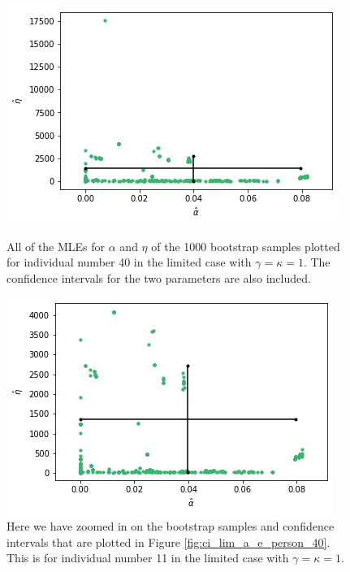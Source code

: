 \begin{figure}
    \centering
    \begin{minipage}{0.48\textwidth}
        \centering
        \includegraphics[scale=0.37]{pictures/ci_lim_a_e_person40.png}
        \caption[MLEs for $\alpha$ and $\eta$ for bootstrap samples individual 40, limited]{All of the MLEs for $\alpha$ and $\eta$ of the 1000 bootstrap samples plotted for individual number 40 in the limited case with $\gamma=\kappa=1$. The confidence intervals for the two parameters are also included.}
        \label{fig:ci_lim_a_e_person_40}
    \end{minipage}\hfill
    \begin{minipage}{0.48\textwidth}
        \centering
        \includegraphics[scale=0.37]{pictures/ci_lim_a_e_person40_zoomed.png}
        \caption[MLEs for $\alpha$ and $\eta$ of bootstrap samples individual 40, unlimited, zoomed]{Here we have zoomed in on the bootstrap samples and confidence intervals that are plotted in Figure \ref{fig:ci_lim_a_e_person_40}. This is for individual number 11 in the limited case with $\gamma=\kappa=1$.}
        \label{fig:ci_lim_a_e_person_40_zoomed}
    \end{minipage}
\end{figure}
